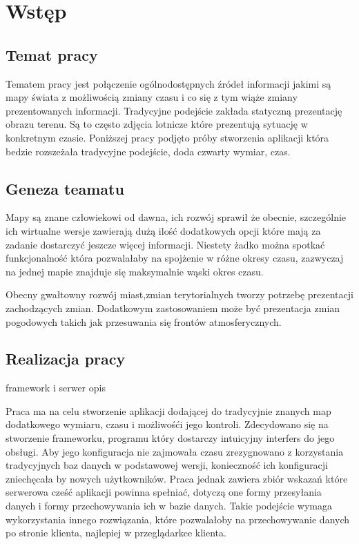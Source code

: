 \chapter{Wstęp}
\label{cha:wstep}

\nocite{gisSystems}
\nocite{webgis}
\nocite{imprxml}
\nocite{perfxml}



\section{Temat pracy}
\label{sec:tematPracy}


Tematem pracy jest połączenie ogólnodostępnych źródeł informacji jakimi są mapy świata z możliwością zmiany czasu i co się z tym wiąże zmiany prezentowanych informacji. Tradycyjne podejście zakłada statyczną prezentację obrazu terenu. Są to często zdjęcia lotnicze które prezentują sytuację w konkretnym czasie. Poniższej pracy podjęto próby stworzenia aplikacji która bedzie rozszeżała tradycyjne podejście, doda czwarty wymiar, czas.

\section{Geneza teamatu}
\label{sec:geneza}

Mapy są znane człowiekowi od dawna, ich rozwój sprawił że obecnie, szczególnie ich wirtualne wersje zawierają dużą ilość dodatkowych opcji które mają za zadanie dostarczyć jeszcze więcej informacji. Niestety żadko można spotkać funkcjonalność która pozwalałaby na spojżenie w różne okresy czasu, zazwyczaj na jednej mapie znajduje się maksymalnie wąski okres czasu.

Obecny gwałtowny rozwój miast,zmian terytorialnych tworzy potrzebę prezentacji zachodzących zmian. Dodatkowym zastosowaniem może być prezentacja zmian pogodowych takich jak przesuwania się frontów atmosferycznych.

\section{Realizacja pracy}
\label{sec:realizacja}


framework i serwer opis 



Praca ma na celu stworzenie aplikacji dodającej do tradycyjnie znanych map dodatkowego wymiaru, czasu i możliwośći jego kontroli. Zdecydowano się na stworzenie frameworku, programu który dostarczy intuicyjny interfers do jego obsługi. Aby jego konfiguracja nie zajmowała czasu zrezygnowano z korzystania tradycyjnych baz danych w podstawowej wersji, konieczność ich konfiguracji zniechęcała by nowych użytkowników. Praca jednak zawiera zbiór wskazań które serwerowa cześć aplikacji powinna spełniać, dotyczą one formy przesyłania danych i formy przechowywania ich w bazie danych. Takie podejście wymaga wykorzystania innego rozwiązania, które pozwalałoby na przechowywanie danych po stronie klienta, najlepiej w przeglądarkce klienta.

